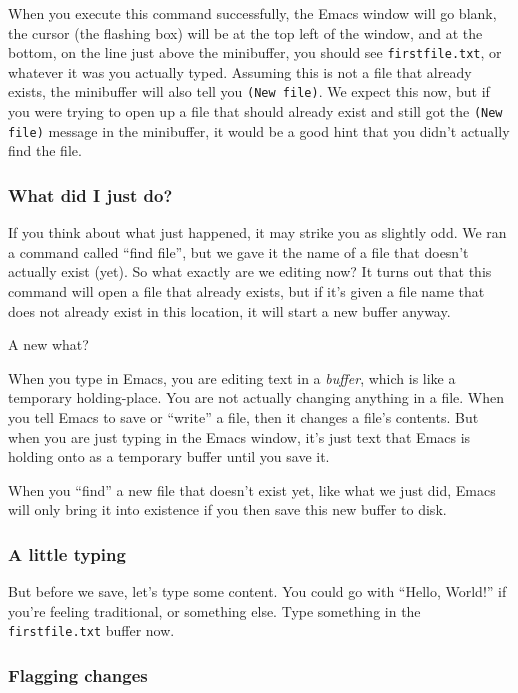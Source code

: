 \documentclass{article}
\begin{document}
When you execute this command successfully, the Emacs window will go blank, the cursor (the flashing box) will be at the top left of the window, and at the bottom, on the line just above the minibuffer, you should see \texttt{firstfile.txt}, or whatever it was you actually typed. Assuming this is not a file that already exists, the minibuffer will also tell you \texttt{(New file)}.  We expect this now, but if you were trying to open up a file that should already exist and still got the \texttt{(New file)} message in the minibuffer, it would be a good hint that you didn't actually find the file.
\subsubsection{What did I just do?}
\label{sec-4-2-6}

If you think about what just happened, it may strike you as slightly odd. We ran a command called ``find file'', but we gave it the name of a file that doesn't actually exist (yet). So what exactly are we editing now?  It turns out that this command will open a file that already exists, but if it's given a file name that does not already exist in this location, it will start a new buffer anyway.

A new what?

When you type in Emacs, you are editing text in a \emph{buffer}, which is like a temporary holding-place.  You are not actually changing anything in a file. When you tell Emacs to save or ``write'' a file, then it changes a file's contents.  But when you are just typing in the Emacs window, it's just text that Emacs is holding onto as a temporary buffer until you save it.

When you ``find'' a new file that doesn't exist yet, like what we just did, Emacs will only bring it into existence if you then save this new buffer to disk.
\subsubsection{A little typing}
\label{sec-4-2-7}

But before we save, let's type some content.  You could go with ``Hello, World!'' if you're feeling traditional, or something else.  Type something in the \texttt{firstfile.txt} buffer now.
\subsubsection{Flagging changes}
\label{sec-4-2-8}
\end{document}
